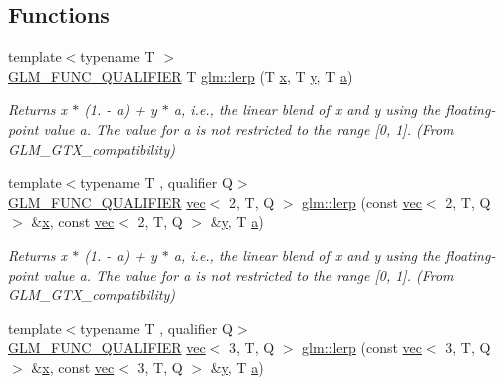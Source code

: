 \subsection*{Functions}
\begin{DoxyCompactItemize}
\item 
{\footnotesize template$<$typename T $>$ }\\\hyperlink{setup_8hpp_a33fdea6f91c5f834105f7415e2a64407}{G\+L\+M\+\_\+\+F\+U\+N\+C\+\_\+\+Q\+U\+A\+L\+I\+F\+I\+ER} T \hyperlink{group__gtx__compatibility_ga5494ba3a95ea6594c86fc75236886864}{glm\+::lerp} (T \hyperlink{_s_d_l__opengl_8h_ad0e63d0edcdbd3d79554076bf309fd47}{x}, T \hyperlink{_s_d_l__opengl_8h_a1675d9d7bb68e1657ff028643b4037e3}{y}, T \hyperlink{_s_d_l__opengl__glext_8h_a3309789fc188587d666cda5ece79cf82}{a})
\begin{DoxyCompactList}\small\item\em Returns x $\ast$ (1. -\/ a) + y $\ast$ a, i.\+e., the linear blend of x and y using the floating-\/point value a. The value for a is not restricted to the range \mbox{[}0, 1\mbox{]}. (From G\+L\+M\+\_\+\+G\+T\+X\+\_\+compatibility) \end{DoxyCompactList}\item 
{\footnotesize template$<$typename T , qualifier Q$>$ }\\\hyperlink{setup_8hpp_a33fdea6f91c5f834105f7415e2a64407}{G\+L\+M\+\_\+\+F\+U\+N\+C\+\_\+\+Q\+U\+A\+L\+I\+F\+I\+ER} \hyperlink{structglm_1_1vec}{vec}$<$ 2, T, Q $>$ \hyperlink{group__gtx__compatibility_gaa551c0a0e16d2d4608e49f7696df897f}{glm\+::lerp} (const \hyperlink{structglm_1_1vec}{vec}$<$ 2, T, Q $>$ \&\hyperlink{_s_d_l__opengl_8h_ad0e63d0edcdbd3d79554076bf309fd47}{x}, const \hyperlink{structglm_1_1vec}{vec}$<$ 2, T, Q $>$ \&\hyperlink{_s_d_l__opengl_8h_a1675d9d7bb68e1657ff028643b4037e3}{y}, T \hyperlink{_s_d_l__opengl__glext_8h_a3309789fc188587d666cda5ece79cf82}{a})
\begin{DoxyCompactList}\small\item\em Returns x $\ast$ (1. -\/ a) + y $\ast$ a, i.\+e., the linear blend of x and y using the floating-\/point value a. The value for a is not restricted to the range \mbox{[}0, 1\mbox{]}. (From G\+L\+M\+\_\+\+G\+T\+X\+\_\+compatibility) \end{DoxyCompactList}\item 
{\footnotesize template$<$typename T , qualifier Q$>$ }\\\hyperlink{setup_8hpp_a33fdea6f91c5f834105f7415e2a64407}{G\+L\+M\+\_\+\+F\+U\+N\+C\+\_\+\+Q\+U\+A\+L\+I\+F\+I\+ER} \hyperlink{structglm_1_1vec}{vec}$<$ 3, T, Q $>$ \hyperlink{group__gtx__compatibility_ga44a8b5fd776320f1713413dec959b32a}{glm\+::lerp} (const \hyperlink{structglm_1_1vec}{vec}$<$ 3, T, Q $>$ \&\hyperlink{_s_d_l__opengl_8h_ad0e63d0edcdbd3d79554076bf309fd47}{x}, const \hyperlink{structglm_1_1vec}{vec}$<$ 3, T, Q $>$ \&\hyperlink{_s_d_l__opengl_8h_a1675d9d7bb68e1657ff028643b4037e3}{y}, T \hyperlink{_s_d_l__opengl__glext_8h_a3309789fc188587d666cda5ece79cf82}{a})

\end{DoxyCompactItemize}
